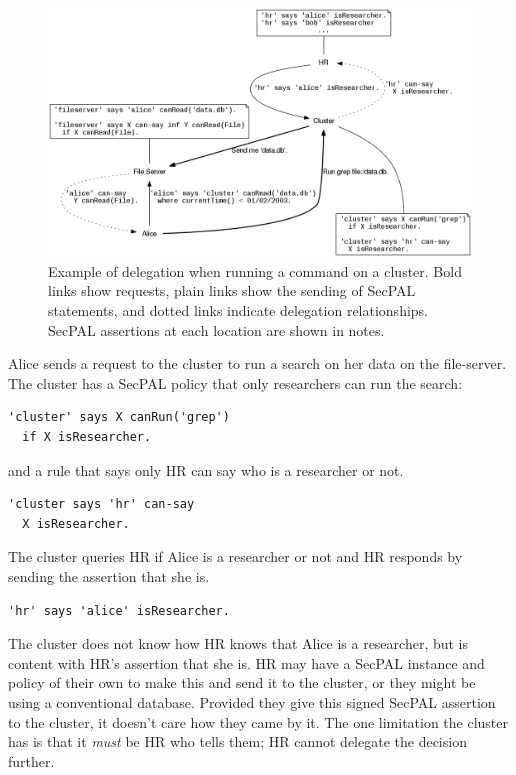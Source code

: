 \documentclass[thesis.tex]{subfiles}
\begin{document}
\begin{figure}
  \centering
  \includegraphics[width=\textwidth]{figures/secpal-example.png}
  \caption[Example of delegation on a cluster.]{Example of delegation when running a command on a cluster.  Bold links show requests, plain links show the sending of SecPAL statements, and dotted links indicate delegation relationships.  SecPAL assertions at each location are shown in notes.}
  \label{fig:delegation-example}
\end{figure}

Alice sends a request to the cluster to run a search on her data on the file-server.
The cluster has a SecPAL policy that only researchers can run the search:
\begin{lstlisting}
'cluster' says X canRun('grep')
  if X isResearcher.
\end{lstlisting}
and a rule that says only HR can say who is a researcher or not.
\begin{lstlisting}
'cluster says 'hr' can-say
  X isResearcher.
\end{lstlisting}
The cluster queries HR if Alice is a researcher or not and HR responds by sending the assertion that she is.
\begin{lstlisting}
'hr' says 'alice' isResearcher.
\end{lstlisting}
The cluster does not know how HR knows that Alice is a researcher, but
is content with HR's assertion that she is.  HR may have a SecPAL
instance and policy of their own to make this and send it to the
cluster, or they might be using a conventional database.  Provided
they give this signed SecPAL assertion to the cluster, it doesn't care
how they came by it.  The one limitation the cluster has is that it
\emph{must} be HR who tells them; HR cannot delegate the decision
further.
\end{document}
